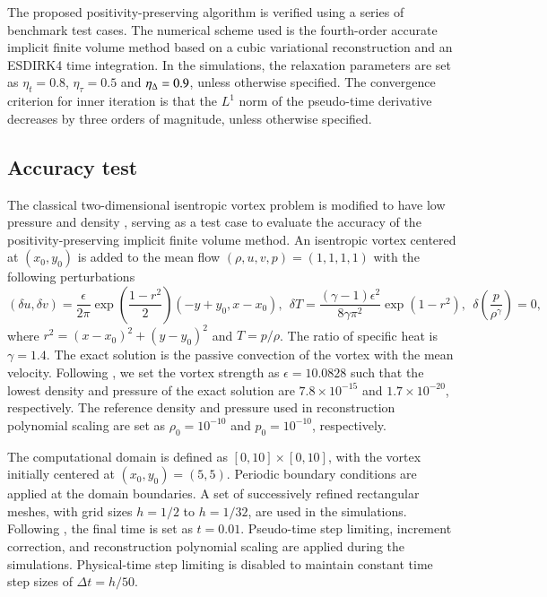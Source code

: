 The proposed positivity-preserving algorithm is verified using a series of benchmark test cases.
The numerical scheme used is the fourth-order accurate implicit finite volume method based on a
cubic variational reconstruction and an ESDIRK4 time integration.
In the simulations, the relaxation parameters are set as $\eta_t= 0.8$, $\eta_\tau=0.5$ and $\eta_\mathrm\Delta=0.9$,
unless otherwise specified.
The convergence criterion for inner iteration is that
the $L^1$ norm of the pseudo-time derivative decreases by three orders of magnitude, unless otherwise specified.

\subsection{Accuracy test}
\label{ssec:accuracy-test}

The classical two-dimensional isentropic vortex problem \cite{hu1999weighted_WENO}
is modified to have low pressure and density \cite{zhang2012positivity}, serving as a test case to evaluate the accuracy of the positivity-preserving implicit finite volume method.
An isentropic vortex centered at $(x_0,y_0)$ is added to the mean flow $(\rho, u, v, p)=(1,1,1,1)$ with the following perturbations
\begin{equation}
    (\delta u, \delta v) = \frac{\epsilon}{2\pi} \exp(\frac{1-r^2}{2}) (-y+y_0, x-x_0),\ \
    \delta T = \frac{(\gamma-1)\epsilon^2}{8\gamma \pi^2}\exp(1-r^2), \ \ \delta\left(\frac{p}{\rho^\gamma}\right)=0, 
\end{equation}
where $r^2=(x-x_0)^2+(y-y_0)^2$ and $T= p/\rho$. The ratio of specific heat is $\gamma=1.4$. The exact solution is the passive convection of the vortex with the mean velocity. Following \cite{zhang2012positivity}, we set the vortex strength as $\epsilon = 10.0828$ such that the lowest density and pressure of the exact solution are $7.8 \times 10^{-15}$ and $1.7 \times 10^{-20}$, respectively.
The reference density and pressure used in reconstruction polynomial scaling are set as $\rho_0 = 10^{-10}$ and $p_0=10^{-10}$, respectively. %

The computational domain is defined as $[0,10]\times[0,10]$, with the vortex initially centered at $(x_0,y_0)=(5,5)$. Periodic boundary conditions are applied at the domain boundaries.  A set of successively refined rectangular meshes, with grid sizes $h=1/2$ to $h=1/32$, are used in the simulations. Following \cite{zhang2012positivity}, the final time is set as $t=0.01$. 
Pseudo-time step limiting, increment correction, and reconstruction polynomial scaling are applied during the simulations. Physical-time step limiting is disabled to maintain constant time step sizes of $\Delta t = h/50$.

